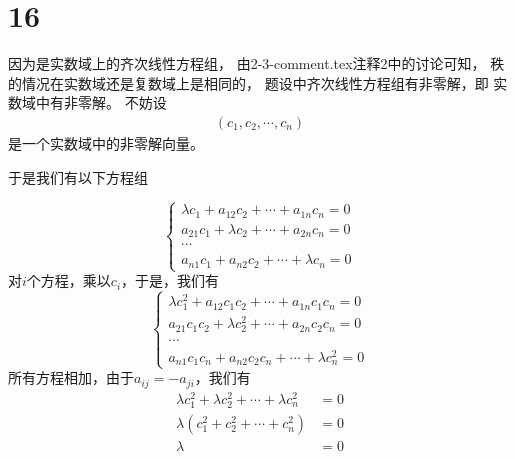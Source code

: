 \documentclass{article}
\begin{document}
\section*{16}

因为是实数域上的齐次线性方程组，
由2-3-comment.tex注释2中的讨论可知，
秩的情况在实数域还是复数域上是相同的，
题设中齐次线性方程组有非零解，即
实数域中有非零解。
不妨设
\begin{align*}
  (c_1, c_2, \cdots, c_n)
\end{align*}
是一个实数域中的非零解向量。

于是我们有以下方程组

\begin{equation*}
  \begin{cases*}
    \lambda c_1 + a_{12} c_2 + \cdots + a_{1n} c_n = 0 \\
    a_{21} c_1 + \lambda c_2 + \cdots + a_{2n} c_n = 0 \\
    \cdots                                             \\
    a_{n1}c_1 + a_{n2}c_2 + \cdots + \lambda c_n = 0
  \end{cases*}
\end{equation*}
对$i$个方程，乘以$c_i$，于是，我们有
\begin{equation*}
  \begin{cases*}
    \lambda c_1^2 + a_{12} c_1c_2 + \cdots + a_{1n} c_1c_n = 0 \\
    a_{21} c_1c_2 + \lambda c_2^2 + \cdots + a_{2n} c_2c_n = 0 \\
    \cdots                                                     \\
    a_{n1}c_1c_n + a_{n2}c_2c_n + \cdots + \lambda c_n^2 = 0
  \end{cases*}
\end{equation*}
所有方程相加，由于$a_{ij} = - a_{ji}$，我们有
\begin{align*}
  \lambda c_1^2 + \lambda c_2^2 + \cdots + \lambda c_n^2 & = 0 \\
  \lambda (c_1^2 + c_2^2 + \cdots + c_n^2)               & = 0 \\
  \lambda                                                & = 0
\end{align*}
\end{document}
